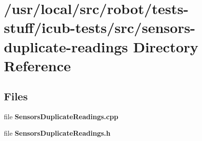 \section{/usr/local/src/robot/tests-\/stuff/icub-\/tests/src/sensors-\/duplicate-\/readings Directory Reference}
\label{dir_918ed0f7f9dbf9a09b3b401b6b49f7b8}
\subsection*{Files}
\begin{DoxyCompactItemize}
\item 
file {\bfseries Sensors\-Duplicate\-Readings.\-cpp}
\item 
file {\bfseries Sensors\-Duplicate\-Readings.\-h}
\end{DoxyCompactItemize}
